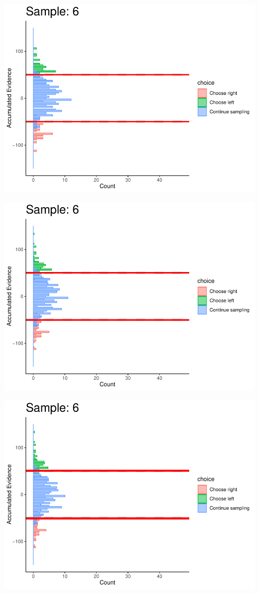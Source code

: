 \documentclass[
]{book}
\begin{document}
\begin{center}\includegraphics[width=0.8\linewidth]{LateNightBayes_files/figure-latex/fixed_dcb-55} \end{center}

\begin{center}\includegraphics[width=0.8\linewidth]{LateNightBayes_files/figure-latex/fixed_dcb-56} \end{center}

\begin{center}\includegraphics[width=0.8\linewidth]{LateNightBayes_files/figure-latex/fixed_dcb-57} \end{center}
\end{document}
